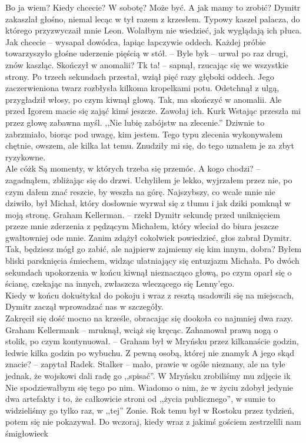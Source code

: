 \documentclass[../MAIN.tex]{subfiles}
\begin{document}
\xx Bo ja wiem? Kiedy chcecie?
\xx W sobotę?
\xx Może być.
\xx A jak mamy to zrobić?
\qd
Dymitr zakaszlał głośno, niemal lecąc w tył razem z krzesłem. Typowy kaszel palacza, do którego przyzwyczaił mnie Leon. Wolałbym nie wiedzieć, jak wyglądają ich płuca.
\sx Jak chcecie -- wysapał dowódca, łapiąc łapczywie oddech. Każdej próbie towarzyszyło głośne uderzenie pięścią w stół. -- Byle by\3k -- urwał po raz drugi, znów kaszląc.
\xx Skończył w anomalii?
\xx T\3k ta! -- sapnął, rzucając się we wszystkie strony.
\qd
Po trzech sekundach przestał, wziął pięć razy głęboki oddech. Jego zaczerwieniona twarz rozbłysła kilkoma kropelkami potu. Odetchnął z ulgą, przygładził włosy, po czym kiwnął głową.
\sx Tak, ma skończyć w anomalii. Ale przed Igorem macie się zająć kimś jeszcze. Zawołaj ich.
Kur\3k
\qd
Wstając przeszła mi przez głowę zabawna myśl.
,,Nie lubię zabójstw na zlecenie.'' Dziwnie to zabrzmiało, biorąc pod uwagę, kim jestem. Tego typu zlecenia wykonywałem chętnie, owszem, ale kilka lat temu. Znudziły mi się, do tego uznałem je za zbyt ryzykowne.\\
Ale cóż\3k Są momenty, w których trzeba się przemóc.
\sx A kogo chodzi? -- zagadnąłem, zbliżając się do drzwi.
\qd
Uchyliłem je lekko, wyjrzałem przez nie, po czym dałem znać reszcie, by weszła na górę. Najszybszy, co wcale mnie nie dziwiło, był Michał, który dosłownie wyrwał się z tłumu i jak dziki pomknął w moją stronę.
\sx Graham Kellerman. -- rzekł Dymitr sekundę przed uniknięciem przeze mnie zderzenia z pędzącym Michałem, który wleciał do biura jeszcze gwałtowniej ode mnie. Zanim zdążył cokolwiek powiedzieć, głos zabrał Dymitr.
\xx Tak, będziesz mógł go zabić, ale najpierw zajmiemy się kim innym, dobra?
\qd
Byłem bliski parsknięcia śmiechem, widząc ulatniający się entuzjazm Michała. Po dwóch sekundach upokorzenia w końcu kiwnął nieznacząco głową, po czym oparł się o ścianę, czekając na innych, zwłaszcza wleczącego się Lenny’ego.\\
Kiedy w końcu dokuśtykał do pokoju i wraz z resztą usadowili się na miejscach, Dymitr zaczął wprowadzać nas w szczegóły.\\
Zakręcił się dość mocno na krześle, obracając się dookoła co najmniej dwa razy.
\sx Graham Kellerman\3k -- mruknął, wciąż się kręcąc. Zahamował prawą nogą o stolik, po czym kontynuował. -- Graham był w Mryńsku przez kilkanaście godzin, ledwie kilka godzin po wybuchu. Z pewną osobą, której nie znamy\3k
\xx A jego skąd znacie? -- zapytał Radek.
\xx Stalker -- mało, prawie w ogóle nieznany, ale na tyle jednak, że wojskowi dali radę go ,,spisać''. W Mryńsku zrobiliśmy mu zdjęcie i\3k Nie spodziewałbym się tego po nim. Wiadomo o nim, że w życiu zdobył jedynie dwa artefakty i to, że całkowicie stroni od ,,życia publicznego'', w sumie to widzieliśmy go tylko raz, w ,,tej'' Zonie. Rok temu był w Rostoku przez tydzień, potem się nie pokazywał. Do wczoraj, kiedy wraz z jakimś gościem zestrzelili nam śmigłowiec\3k
\end{document}
